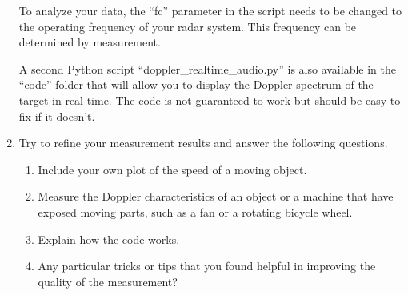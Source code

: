 \documentclass[letterpaper, 11pt]{article}
\begin{document}
\begin{enumerate}
		To analyze your data, the ``fc'' parameter in the script needs to be changed to the operating frequency of your radar system. This frequency can be determined by measurement. 
	
		A second Python script ``doppler\_realtime\_audio.py'' is also available in the ``code'' folder that will allow you to display the Doppler spectrum of the target in real time. The code is not guaranteed to work but should be easy to fix if it doesn't. 		
				
		\item Try to refine your measurement results and answer the following questions. 
			\begin{enumerate}
				\item Include your own plot of the speed of a moving object. 
				
				\item Measure the Doppler characteristics of an object or a machine that have exposed moving parts, such as a fan or a rotating bicycle wheel. 
				
				\item Explain how the code works. 

				\item Any particular tricks or tips that you found helpful in improving the quality of the measurement? 
			\end{enumerate}
		
	\end{enumerate}
\end{document}
